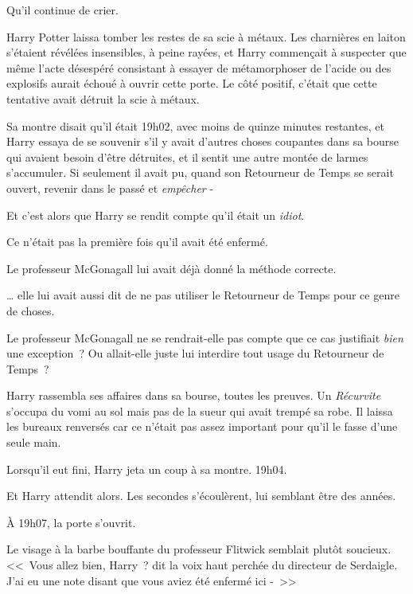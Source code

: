 Qu'il continue de crier.

\later

Harry Potter laissa tomber les restes de sa scie à métaux. Les charnières en laiton s'étaient révélées insensibles, à peine rayées, et Harry commençait à suspecter que même l'acte désespéré consistant à essayer de métamorphoser de l'acide ou des explosifs aurait échoué à ouvrir cette porte. Le côté positif, c'était que cette tentative avait détruit la scie à métaux.

Sa montre disait qu'il était 19h02, avec moins de quinze minutes restantes, et Harry essaya de se souvenir s'il y avait d'autres choses coupantes dans sa bourse qui avaient besoin d'être détruites, et il sentit une autre montée de larmes s'accumuler. Si seulement il avait pu, quand son Retourneur de Temps se serait ouvert, revenir dans le passé et \emph{empêcher} -

Et c'est alors que Harry se rendit compte qu'il était un \emph{idiot}.

Ce n'était pas la première fois qu'il avait été enfermé.

Le professeur McGonagall lui avait déjà donné la méthode correcte.

… elle lui avait aussi dit de ne pas utiliser le Retourneur de Temps pour ce genre de choses.

Le professeur McGonagall ne se rendrait-elle pas compte que ce cas justifiait \emph{bien} une exception~? Ou allait-elle juste lui interdire tout usage du Retourneur de Temps~?

Harry rassembla ses affaires dans sa bourse, toutes les preuves. Un \emph{Récurvite} s'occupa du vomi au sol mais pas de la sueur qui avait trempé sa robe. Il laissa les bureaux renversés car ce n'était pas assez important pour qu'il le fasse d'une seule main.

Lorsqu'il eut fini, Harry jeta un coup à sa montre. 19h04.

Et Harry attendit alors. Les secondes s'écoulèrent, lui semblant être des années.

À 19h07, la porte s'ouvrit.

Le visage à la barbe bouffante du professeur Flitwick semblait plutôt soucieux. <<~Vous allez bien, Harry~? dit la voix haut perchée du directeur de Serdaigle. J'ai eu une note disant que vous aviez été enfermé ici -~>>
